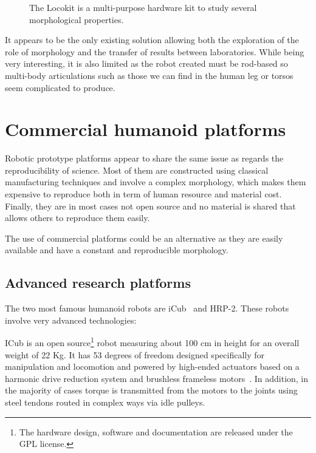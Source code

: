 \begin{figure}[tb]
\centering
    \hfil
    \caption{The Locokit is a multi-purpose hardware kit to study several morphological properties.}
    \label{fig:locokit}
\end{figure}

It appears to be the only existing solution allowing both the exploration of the role of morphology and the transfer of results between laboratories. While being very interesting, it is also limited as the robot created must be rod-based so multi-body articulations such as those we can find in the human leg or torsos seem complicated to produce.


\section{Commercial humanoid platforms} %

Robotic prototype platforms appear to share the same issue as regards the reproducibility of science. Most of them are constructed using classical manufacturing techniques and involve a complex morphology, which makes them expensive to reproduce both in term of human resource and material cost. Finally, they are in most cases not open source and no material is shared that allows others to reproduce them easily.

The use of commercial platforms could be an alternative as they are easily available and have a constant and reproducible morphology.

\subsection{Advanced research platforms} %

The two most famous humanoid robots are iCub~\parencite{metta2008icub} and HRP-2. These robots involve very advanced technologies:

ICub is an open source\footnote{The hardware design, software and documentation are released under the GPL license.} robot measuring about 100 cm in height for an overall weight of 22 Kg. It has 53 degrees of freedom designed specifically for manipulation and locomotion and powered by high-ended actuators based on a harmonic drive reduction system and brushless frameless motors~\parencite{natale2013icub}. In addition, in the majority of cases torque is transmitted from the motors to the joints using steel tendons routed in complex ways via idle pulleys.

